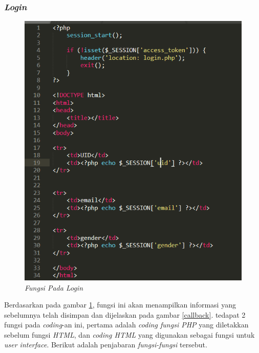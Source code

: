 \subsubsection{\textit{Login}}
\begin{figure}[!htbp]
    \centering
    \includegraphics[scale=0.5]{gambar/login}
    \caption{\textit{Fungsi Pada Login}}
    \label{login}
\end{figure}
\par 
Berdasarkan pada gambar \ref{login}, fungsi ini akan menampilkan informasi yang sebelumnya telah disimpan dan dijelaskan pada gambar \ref{callback}. tedapat 2 fungsi pada \textit{coding}-an ini, pertama adalah \textit{coding fungsi PHP} yang diletakkan sebelum fungsi \textit{HTML}, dan \textit{coding HTML} yang digunakan sebagai fungsi untuk \textit{user interface}. Berikut adalah penjabaran \textit{fungsi-fungsi} tersebut.
